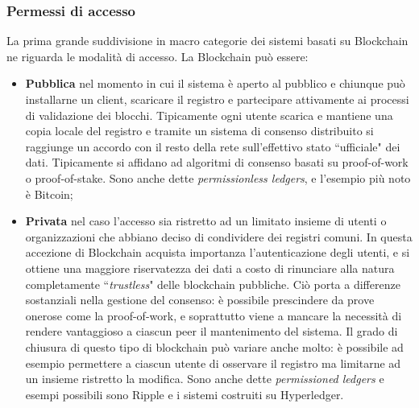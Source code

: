 		\subsubsection{Permessi di accesso}
			La prima grande suddivisione in macro categorie dei sistemi basati su Blockchain ne riguarda le modalità di accesso. La Blockchain può essere:
			\begin{itemize}
				\item \textbf{Pubblica} nel momento in cui il sistema è aperto al pubblico e chiunque può installarne un client, scaricare il registro e partecipare attivamente ai processi di validazione dei blocchi. Tipicamente ogni utente scarica e mantiene una copia locale del registro e tramite un sistema di consenso distribuito si raggiunge un accordo con il resto della rete sull'effettivo stato ``ufficiale" dei dati. Tipicamente si affidano ad algoritmi di consenso basati su proof-of-work o proof-of-stake. Sono anche dette \emph{permissionless ledgers}, e l'esempio più noto è Bitcoin;
				\item \textbf{Privata} nel caso l'accesso sia ristretto ad un limitato insieme di utenti o organizzazioni che abbiano deciso di condividere dei registri comuni. In questa accezione di Blockchain acquista importanza l'autenticazione degli utenti, e si ottiene una maggiore riservatezza dei dati a costo di rinunciare alla natura completamente ``\emph{trustless}" delle blockchain pubbliche. Ciò porta a differenze sostanziali nella gestione del consenso: è possibile prescindere da prove onerose come la proof-of-work, e soprattutto viene a mancare la necessità di rendere vantaggioso a ciascun peer il mantenimento del sistema.
				Il grado di chiusura di questo tipo di blockchain può variare anche molto: è possibile ad esempio permettere a ciascun utente di osservare il registro ma limitarne ad un insieme ristretto la modifica. Sono anche dette \emph{permissioned ledgers} e esempi possibili sono Ripple e i sistemi costruiti su Hyperledger.
			\end{itemize}
		
